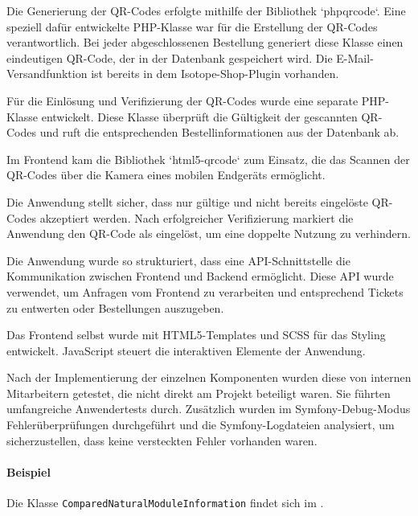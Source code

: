 Die Generierung der QR-Codes erfolgte mithilfe der Bibliothek `phpqrcode`. Eine speziell dafür entwickelte PHP-Klasse war für die Erstellung der QR-Codes verantwortlich. Bei jeder abgeschlossenen Bestellung generiert diese Klasse einen eindeutigen QR-Code, der in der Datenbank gespeichert wird. Die E-Mail-Versandfunktion ist bereits in dem Isotope-Shop-Plugin vorhanden.

Für die Einlösung und Verifizierung der QR-Codes wurde eine separate PHP-Klasse entwickelt. Diese Klasse überprüft die Gültigkeit der gescannten QR-Codes und ruft die entsprechenden Bestellinformationen aus der Datenbank ab.

Im Frontend kam die Bibliothek `html5-qrcode` zum Einsatz, die das Scannen der QR-Codes über die Kamera eines mobilen Endgeräts ermöglicht.

Die Anwendung stellt sicher, dass nur gültige und nicht bereits eingelöste QR-Codes akzeptiert werden. Nach erfolgreicher Verifizierung markiert die Anwendung den QR-Code als eingelöst, um eine doppelte Nutzung zu verhindern.

Die Anwendung wurde so strukturiert, dass eine API-Schnittstelle die Kommunikation zwischen Frontend und Backend ermöglicht. Diese \acs{API} wurde verwendet, um Anfragen vom Frontend zu verarbeiten und entsprechend Tickets zu entwerten oder Bestellungen auszugeben. 

Das Frontend selbst wurde mit HTML5-Templates und \acs{SCSS} für das Styling entwickelt. JavaScript steuert die interaktiven Elemente der Anwendung.

Nach der Implementierung der einzelnen Komponenten wurden diese von internen Mitarbeitern getestet, die nicht direkt am Projekt beteiligt waren. Sie führten umfangreiche Anwendertests durch.
Zusätzlich wurden im Symfony-Debug-Modus Fehlerüberprüfungen durchgeführt und die Symfony-Logdateien analysiert, um sicherzustellen, dass keine versteckten Fehler vorhanden waren.

\paragraph{Beispiel}
Die Klasse \texttt{Com\-par\-ed\-Na\-tu\-ral\-Mo\-dule\-In\-for\-ma\-tion} findet sich im .  
